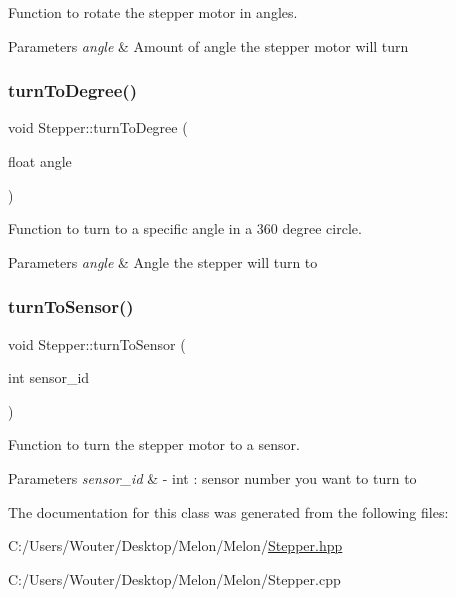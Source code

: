Function to rotate the stepper motor in angles. 


\begin{DoxyParams}{Parameters}
{\em angle} & Amount of angle the stepper motor will turn \\
\hline
\end{DoxyParams}
\mbox{\label{class_stepper_a5fa54ffe303a6cc23d9a89920f648d68}} 
\subsubsection{\texorpdfstring{turn\+To\+Degree()}{turnToDegree()}}
{\footnotesize\ttfamily void Stepper\+::turn\+To\+Degree (\begin{DoxyParamCaption}\item[{float}]{angle }\end{DoxyParamCaption})}



Function to turn to a specific angle in a 360 degree circle. 


\begin{DoxyParams}{Parameters}
{\em angle} & Angle the stepper will turn to \\
\hline
\end{DoxyParams}
\mbox{\label{class_stepper_a9d6eeff6e62711bc18115d4a6a1d5ac2}} 
\subsubsection{\texorpdfstring{turn\+To\+Sensor()}{turnToSensor()}}
{\footnotesize\ttfamily void Stepper\+::turn\+To\+Sensor (\begin{DoxyParamCaption}\item[{int}]{sensor\+\_\+id }\end{DoxyParamCaption})}



Function to turn the stepper motor to a sensor. 


\begin{DoxyParams}{Parameters}
{\em sensor\+\_\+id} & -\/ int \+: sensor number you want to turn to \\
\hline
\end{DoxyParams}


The documentation for this class was generated from the following files\+:\begin{DoxyCompactItemize}
\item 
C\+:/\+Users/\+Wouter/\+Desktop/\+Melon/\+Melon/\hyperlink{_stepper_8hpp}{Stepper.\+hpp}\item 
C\+:/\+Users/\+Wouter/\+Desktop/\+Melon/\+Melon/Stepper.\+cpp\end{DoxyCompactItemize}
